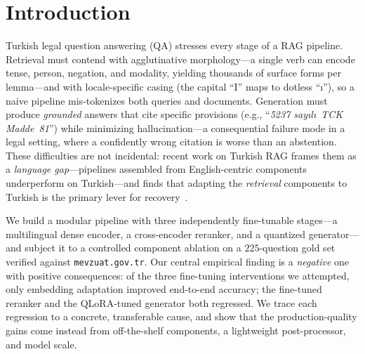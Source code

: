 \documentclass[conference]{IEEEtran}
\begin{document}
\section{Introduction}
Turkish legal question answering (QA) stresses every stage of a RAG pipeline.
Retrieval must contend with agglutinative morphology---a single verb can encode
tense, person, negation, and modality, yielding thousands of surface forms per
lemma---and with locale-specific casing (the capital ``I'' maps to dotless
``\i''), so a naive pipeline mis-tokenizes both queries and documents.
Generation must produce \emph{grounded} answers that cite specific provisions
(e.g., ``\emph{5237 say\i l\i\ TCK Madde~81}'') while minimizing
hallucination---a consequential failure mode in a legal setting, where a
confidently wrong citation is worse than an abstention. These difficulties are
not incidental: recent work on Turkish RAG frames them as a \emph{language
gap}---pipelines assembled from English-centric components underperform on
Turkish---and finds that adapting the \emph{retrieval} components to Turkish is
the primary lever for recovery~\cite{bikmaz2025bridging}.

We build a modular pipeline with three independently fine-tunable stages---a
multilingual dense encoder, a cross-encoder reranker, and a quantized
generator---and subject it to a controlled component ablation on a
$225$-question gold set verified against \texttt{mevzuat.gov.tr}. Our central
empirical finding is a \emph{negative} one with positive consequences: of the
three fine-tuning interventions we attempted, only embedding adaptation
improved end-to-end accuracy; the fine-tuned reranker and the QLoRA-tuned
generator both regressed. We trace each regression to a concrete, transferable
cause, and show that the production-quality gains come instead from
off-the-shelf components, a lightweight post-processor, and model scale.
\end{document}
